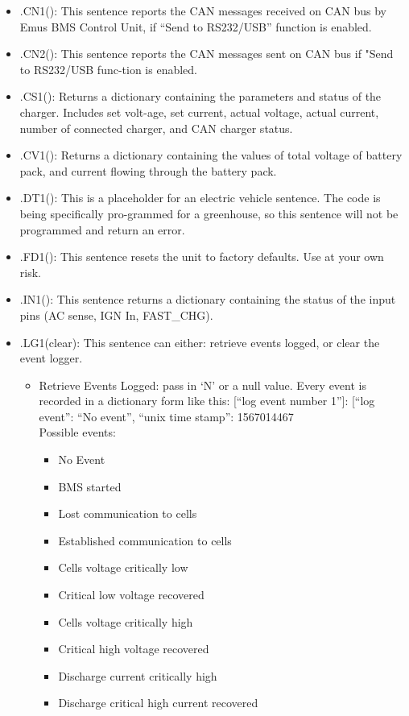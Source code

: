 \begin{itemize}
	\item .CN1(): This sentence reports the CAN messages received on CAN bus by Emus BMS Control Unit, if “Send to RS232/USB” function is enabled.
	\item .CN2(): This sentence reports the CAN messages sent on CAN bus if "Send to RS232/USB func-tion is enabled.
	\item .CS1(): Returns a dictionary containing the parameters and status of the charger. Includes set volt-age, set current, actual voltage, actual current, number of connected charger, and CAN charger status.
	\item .CV1(): Returns a dictionary containing the values of total voltage of battery pack, and current flowing through the battery pack.
	\item .DT1(): This is a placeholder for an electric vehicle sentence. The code is being specifically pro-grammed for a greenhouse, so this sentence will not be programmed and return an error.
	\item .FD1(): This sentence resets the unit to factory defaults. Use at your own risk.
	\item .IN1(): This sentence returns a dictionary containing the status of the input pins (AC sense, IGN In, FAST\_CHG).
	\item .LG1(clear): This sentence can either: retrieve events logged, or clear the event logger.
	\begin{itemize}
		\item Retrieve Events Logged: pass in ‘N’ or a null value. Every event is recorded in a dictionary form like this: [“log event number 1”]: [“log event”: “No event”, “unix time stamp”: 1567014467\\
		Possible events:
		\begin{itemize}
			\item No Event
			\item BMS started
			\item Lost communication to cells
			\item Established communication to cells
			\item Cells voltage critically low
			\item Critical low voltage recovered
			\item Cells voltage critically high
			\item Critical high voltage recovered
			\item Discharge current critically high
			\item Discharge critical high current recovered

\end{itemize}
\end{itemize}
\end{itemize}
